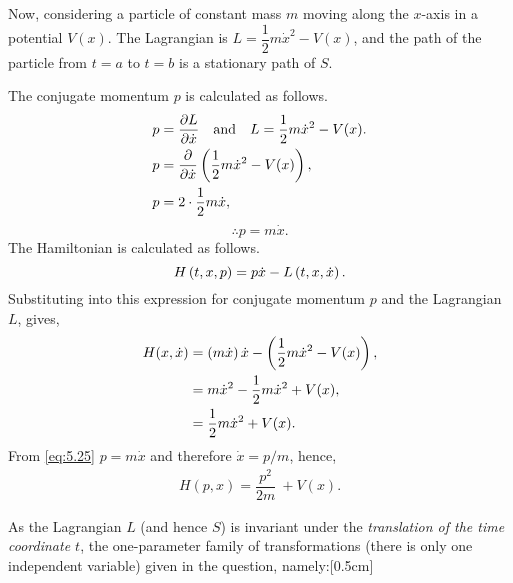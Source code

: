 \begin{comment}
For (e), it is the case that xi=0, tau=1 (or at least tau=constant), but it's not to do with the fact that the motion is one-dimensional. Look at where xi and tau come from and note that specifically part (e) says that L is invariant 'under translation of t'. That's the best hint I can give, I think.
\end{comment}
Now, considering a particle of constant mass $m$ moving along the $x$-axis in a potential $V(x)$. The Lagrangian is $L=\dfrac{1}{2}m\dot{x}^2 - V(x)$, and the path of the particle from $t=a$ to $t=b$ is a stationary path of $S$.

The conjugate momentum $p$ is calculated as follows.
\begin{align*}
	p &= \frac{\partial L}{\partial \dot{x}}\quad\text{and}\quad L=\dfrac{1}{2}m\dot{x}^2 - V(x).\\
	p &=\frac{\partial }{\partial \dot{x}}\left(\dfrac{1}{2}m\dot{x}^2 - V(x)\right),\\
	p &= 2\cdot\frac{1}{2} m\dot{x},
\end{align*}
\begin{equation}
\label{eq:5.25}
	\therefore\boxed{p = m\dot{x}.}
\end{equation}
The Hamiltonian is calculated as follows.
\[
	H\left(t,x,p\right)=p\dot{x}-L\left(t,x,\dot{x}\right).
\]
Substituting into this expression for conjugate momentum $p$ and the Lagrangian $L$, gives,
\begin{align*}
	H(x,\dot{x}) &= \left(m\dot{x}\right)\dot{x} - \left(\dfrac{1}{2}m\dot{x}^2 - V(x)\right),\\
	&=m\dot{x}^2 - \dfrac{1}{2}m\dot{x}^2 + V(x),\\
	&=\dfrac{1}{2}m\dot{x}^2 + V(x).
\end{align*}
From \eqref{eq:5.25} $p=m\dot{x}$ and therefore $\dot{x}=p/m$, hence,
\begin{align}
\label{eq:5.26}
	\boxed{H(p,x)=\dfrac{p^2}{2m}\ + V(x).}
\end{align}
\begin{comment}
	If the Lagrangian does not depend explicitly on time, then the Hamiltonian, too, does not depend explicitly on time.
	For example,  V(x)=1/2kx2 , has no explicit time dependence ( ∂V/∂t=0 ) even though  x  will change with time 
\end{comment}
As the Lagrangian $L$ (and hence $S$) is invariant under the \textit{translation of the time coordinate $t$}, the one-parameter family of transformations (there is only one independent variable) given in the question, namely:[0.5cm]
